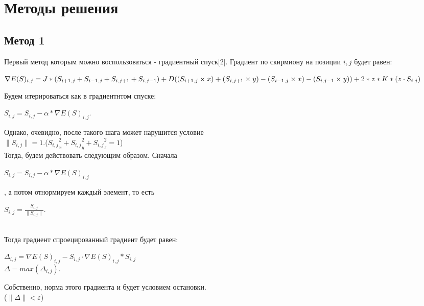 \documentclass[ 12pt,x11names]{article}
\begin{document}
    \section{Методы решения}
    \subsection{Метод 1}
    Первый метод которым можно воспользоваться  - градиентный спуск[2]. Градиент по скирмиону на позиции $i, j$ будет равен:
      \begin{center}
    $\nabla E(S)_{i, j} = J * (S_{i + 1,j} + S_{i - 1,j} + S_{i, j + 1} + S_{i, j - 1})
        + \\ D  ( (S_{i + 1,j} \times x) + (S_{i, j + 1} \times y) -  (S_{i - 1, j} \times x) - (S_{i, j - 1} \times y) )\\
        + 2 * z * K * (z \cdot S_{i, j})$\\
          \end{center}
    Будем  итерироваться как в градиентнтом спуске:
    \begin{center}
    $S_{i, j} = S_{i, j} - \alpha * \nabla E(S)_{i, j}$.\\
    \end{center}
    Однако, очевидно, после такого шага может  нарушится условие\\ $\|S_{i, j}\| = 1$.(${S_{i,j}}_x^2 + {S_{i,j}}_y^2 + {S_{i,j}}_z^2 = 1$)\\
    Тогда, будем действовать следующим образом. Сначала \\
    \begin{center}
    $S_{i, j} = S_{i, j} - \alpha * \nabla E(S)_{i, j}$
    \end{center}, а потом отнормируем каждый элемент, то есть \begin{center}$S_{i, j} = \frac{S_{i, j}}{\|S_{i, j}\|}$.\end{center}\\
    Тогда градиент спроецированный градиент будет равен:\\
    \begin{center}
    $\Delta_{i, j} = \nabla E(S)_{i, j} - S_{i, j} \cdot \nabla E(S)_{i, j} * S_{i, j}$\\
    $\Delta = max(\Delta_{i, j}).$\\
    \end{center}
    Собственно, норма этого градиента и будет условием остановки.\\
    ($\| \Delta \|< \varepsilon$)\\
\end{document}
